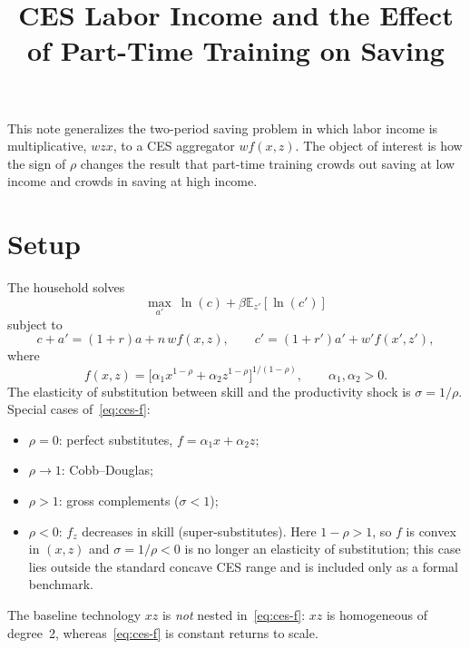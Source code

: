 \documentclass[12pt]{article}
\title{CES Labor Income and the Effect of Part-Time Training on Saving}
\author{}
\date{}
\begin{document}
\maketitle

\noindent This note generalizes the two-period saving problem in which labor income is multiplicative, $wzx$, to a CES aggregator $wf(x,z)$. The object of interest is how the sign of $\rho$ changes the result that part-time training crowds out saving at low income and crowds in saving at high income.

\section{Setup}

The household solves
\begin{equation}
    \max_{a'}\ \ln(c)+\beta\mathbb{E}_{z'}[\ln(c')]
\end{equation}
subject to
\begin{equation}
    c+a'=(1+r)a+n\,w f(x,z),
    \qquad
    c'=(1+r')a'+w'f(x',z'),
\end{equation}
where
\begin{equation}
    f(x,z)
    =
    \bigl[\alpha_1 x^{1-\rho}+\alpha_2 z^{1-\rho}\bigr]^{1/(1-\rho)},
    \qquad
    \alpha_1,\alpha_2>0.
    \label{eq:ces-f}
\end{equation}
The elasticity of substitution between skill and the productivity shock is $\sigma=1/\rho$. Special cases of~\eqref{eq:ces-f}:
\begin{itemize}
    \item $\rho=0$: perfect substitutes, $f=\alpha_1 x+\alpha_2 z$;
    \item $\rho\to 1$: Cobb--Douglas;
    \item $\rho>1$: gross complements ($\sigma<1$);
    \item $\rho<0$: $f_z$ decreases in skill (super-substitutes). Here $1-\rho>1$, so $f$ is convex in $(x,z)$ and $\sigma=1/\rho<0$ is no longer an elasticity of substitution; this case lies outside the standard concave CES range and is included only as a formal benchmark.
\end{itemize}
The baseline technology $xz$ is \emph{not} nested in~\eqref{eq:ces-f}: $xz$ is homogeneous of degree~2, whereas~\eqref{eq:ces-f} is constant returns to scale.
\end{document}
